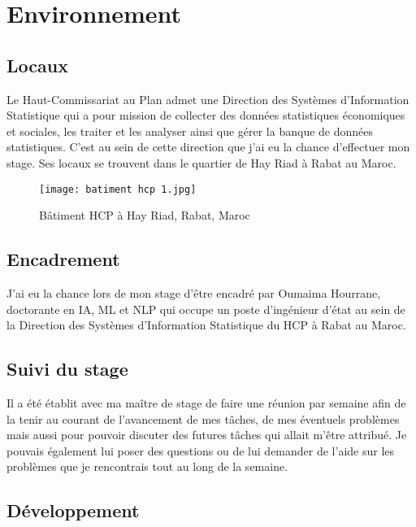 \documentclass[a4paper,french,12pt]{article}
\begin{document}
\section{Environnement}
\label{sec:Environnement}

\subsection{Locaux}

Le Haut-Commissariat au Plan admet une Direction des Systèmes d'Information Statistique qui a pour mission de collecter des données statistiques économiques et sociales, les traiter et les analyser ainsi que gérer la banque de données statistiques. C'est au sein de cette direction que j'ai eu la chance d'effectuer mon stage. Ses locaux se trouvent dans le quartier de Hay Riad à Rabat au Maroc.\\

\begin{figure}[!h]      
    \centering
    \texttt{[image: batiment hcp 1.jpg]}
    \caption{Bâtiment HCP à Hay Riad, Rabat, Maroc}
\end{figure}

\subsection{Encadrement}

J'ai eu la chance lors de mon stage d'être encadré par Oumaima Hourrane, doctorante en IA, ML et NLP qui occupe un poste d'ingénieur d'état au sein de la Direction des Systèmes d’Information Statistique du HCP à Rabat au Maroc.

\subsection{Suivi du stage}

Il a été établit avec ma maître de stage de faire une réunion par semaine afin de la tenir au courant de l'avancement de mes tâches, de mes éventuels problèmes mais aussi pour pouvoir discuter des futures tâches qui allait m'être attribué. Je pouvais également lui poser des questions ou de lui demander de l'aide sur les problèmes que je rencontrais tout au long de la semaine.

\subsection{Développement}
\end{document}
